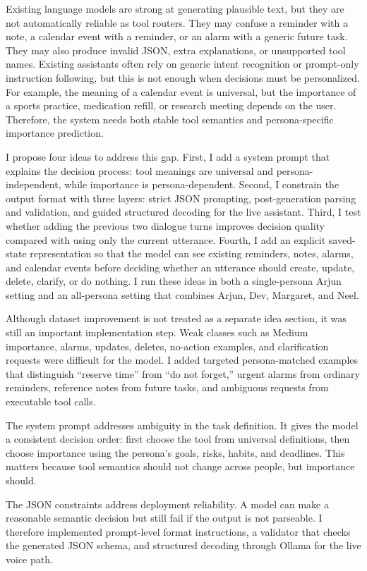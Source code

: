 \documentclass[11pt,a4paper]{article}
\begin{document}
Existing language models are strong at generating plausible text, but they are not automatically reliable as tool routers. They may confuse a reminder with a note, a calendar event with a reminder, or an alarm with a generic future task. They may also produce invalid JSON, extra explanations, or unsupported tool names. Existing assistants often rely on generic intent recognition or prompt-only instruction following, but this is not enough when decisions must be personalized. For example, the meaning of a calendar event is universal, but the importance of a sports practice, medication refill, or research meeting depends on the user. Therefore, the system needs both stable tool semantics and persona-specific importance prediction.

I propose four ideas to address this gap. First, I add a system prompt that explains the decision process: tool meanings are universal and persona-independent, while importance is persona-dependent. Second, I constrain the output format with three layers: strict JSON prompting, post-generation parsing and validation, and guided structured decoding for the live assistant. Third, I test whether adding the previous two dialogue turns improves decision quality compared with using only the current utterance. Fourth, I add an explicit saved-state representation so that the model can see existing reminders, notes, alarms, and calendar events before deciding whether an utterance should create, update, delete, clarify, or do nothing. I run these ideas in both a single-persona Arjun setting and an all-persona setting that combines Arjun, Dev, Margaret, and Neel.

Although dataset improvement is not treated as a separate idea section, it was still an important implementation step. Weak classes such as Medium importance, alarms, updates, deletes, no-action examples, and clarification requests were difficult for the model. I added targeted persona-matched examples that distinguish ``reserve time'' from ``do not forget,'' urgent alarms from ordinary reminders, reference notes from future tasks, and ambiguous requests from executable tool calls.

The system prompt addresses ambiguity in the task definition. It gives the model a consistent decision order: first choose the tool from universal definitions, then choose importance using the persona's goals, risks, habits, and deadlines. This matters because tool semantics should not change across people, but importance should.

The JSON constraints address deployment reliability. A model can make a reasonable semantic decision but still fail if the output is not parseable. I therefore implemented prompt-level format instructions, a validator that checks the generated JSON schema, and structured decoding through Ollama for the live voice path.
\end{document}
